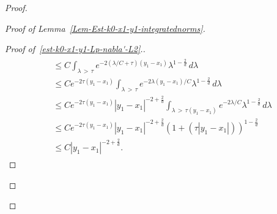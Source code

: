 \documentclass[10pt]{amsart}
\theoremstyle{definition}\newtheorem{defi}[theo]{Definition}\newtheorem{rema}[theo]{Remark}\newtheorem{exam}[theo]{Example}\newtheorem{exem}[theo]{Example}\newtheorem{nota}[theo]{Notation}
\renewcommand{\leq}{\leqslant}
\begin{document}
\begin{proof}
\begin{proof}[Proof of Lemma~\ref{Lem-Est-k0-x1-y1-integratednorms}]
\begin{proof}[{Proof of~\eqref{est-k0-x1-y1-Lp-nabla'-L2}.}]
\begin{multline*}
\begin{aligned}
&\leq C \int_{\lambda\,>\,\tau} e^{-2(\lambda/C + \tau)(y_1 - x_1)} \lambda^{1-\frac{2}{d}} \, d \lambda
\\
&\leq C e^{- 2 \tau (y_1 - x_1)}
\int_{\lambda\,>\,\tau} e^{-2\lambda(y_1 - x_1)/C} \lambda^{1-\frac{2}{d}} \, d \lambda
\\
&\leq Ce^{- 2 \tau (y_1 - x_1)} |y_1 -x_1|^{-2+\frac{2}{d}} \int_{\lambda\,>\,\tau (y_1 - x_1)} e^{-2 \lambda/C} \lambda^{1-\frac{2}{d}} \, d\lambda
\\
&\leq C e^{-2\tau(y_1 -x_1)}|y_1 -x_1|^{-2+ \frac{2}{d}} (1+ (\tau |y_1 -x_1|))^{1-\frac{2}{d}}
\\
&
\leq C |y_1-x_1|^{-2+\frac{2}{d}}.
\end{aligned}
\end{multline*}


\end{proof}
\end{proof}
\end{proof}
\end{document}
